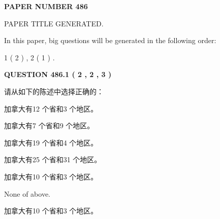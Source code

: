 \documentclass{ctexart}
\begin{document}
   
   
   
\newpage 
\setcounter{page}{ 
   486001 } 
   
   
   
   
 {\textbf{ \Large{ PAPER NUMBER  486  }}}
   
   
\vspace{0.2in}
   
   
   
   
   
   
   
   
 \vspace{0.2in}
 
 
 
 
   
   
 PAPER TITLE GENERATED.
   
   
   
\vspace{0.2in}
   
In this paper, big questions will be generated in the following order: 
   
   
   1 ( 2 )
 ,
   2 ( 1 )
 .
  
\vspace{0.2in}
  
{\textbf{\Large{QUESTION
486.1 
 ( 2 , 2 , 3 )
}}}
  
  
请从如下的陈述中选择正确的：
 
 
加拿大有12 个省和3 个地区。
 
 
加拿大有7 个省和9 个地区。
 
 
加拿大有19 个省和4 个地区。
 
 
加拿大有25 个省和31 个地区。
 
 
加拿大有10 个省和3 个地区。
 
 
 None of above.
 
 
\noindent{}
 
 
加拿大有10 个省和3 个地区。
 
 
\noindent{}
 
 
   
   
   
\end{document}
